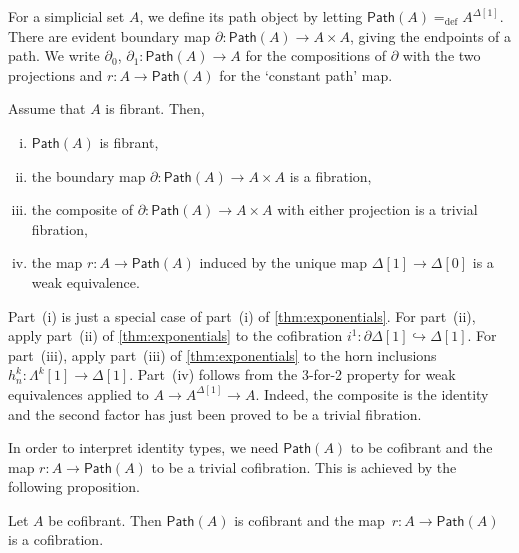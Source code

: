 \documentclass[reqno,10pt,a4paper,oneside]{amsart}
\makeatletter
\renewenvironment{proof}[1][\proofname] {\par\pushQED{\qed}\normalfont\topsep6\p@\@plus6\p@\relax\trivlist\item[\hskip\labelsep\bf#1\@addpunct{.}]\ignorespaces}{\popQED\endtrivlist\@endpefalse}
\numberwithin{equation}{section}
\theoremstyle{mythm}
\theoremstyle{mydef}
\theoremstyle{myrmk}
\newcommand{\defeq}{=_{\operatorname{def}}}
\newcommand{\co}{\colon}
\newcommand{\Path}{\mathsf{Path}}
\makeatother
\begin{document}
For a simplicial set $A$, we define its path object by letting $\Path(A) \defeq A^{\Delta[1]}$. 
There are evident boundary map $\partial \co \Path(A) \to A \times A$, giving
the endpoints of a path. We write $\partial_0$, $\partial_1 \co \Path(A) \to A$ for the compositions of $\partial$
with the two projections and $r \co A \to \Path(A)$ for the `constant path' map.



\begin{proposition} \label{thm:id-types-for-types}
Assume that $A$ is fibrant. Then,
\begin{enumerate}[(i)] 
\item $\Path(A)$ is fibrant,
\item the boundary map $\partial  \co \Path(A) \rightarrow A \times A$ is a fibration,
\item the composite of $\partial \co \Path(A) \rightarrow A \times A$ with either projection is a trivial fibration,
\item the map $r \co A \rightarrow \Path(A)$ induced by the unique map $\Delta[1] \rightarrow \Delta[0]$ is a weak equivalence.
\end{enumerate}
\end{proposition} 

\begin{proof}
Part~(i) is just a special case of part~(i) of \cref{thm:exponentials}. For part~(ii), apply part~(ii) of \cref{thm:exponentials} to the cofibration $i^1 \co \partial \Delta[1]  \hookrightarrow \Delta[1]$. For part~(iii), apply part~(iii) of \cref{thm:exponentials} to the horn inclusions $h^k_n \co \Lambda^k[1]  \rightarrow \Delta[1]$. Part~(iv) follows from the 3-for-2 property for weak equivalences applied to $A \rightarrow A^{\Delta[1]} \rightarrow A$. Indeed, the
composite is the identity and the second factor has just been proved to be a trivial fibration.
\end{proof}


In order to interpret identity types, we need $\Path(A)$ to be cofibrant and the map $r \co A \rightarrow \Path(A)$ to be a trivial cofibration. This is achieved by the following proposition.

\begin{proposition}\label{proposition:PathObjectCofibrant}
Let $A$ be cofibrant. Then $\Path(A)$ is cofibrant and the map~$r \co A \rightarrow \Path(A)$ is a cofibration.
\end{proposition}
\end{document}
